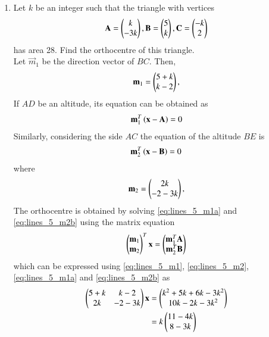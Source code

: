 \begin{enumerate}[label=\arabic*.,ref=\thesubsection.\theenumi]
\item Let $k$ be an integer such that the triangle with vertices
\begin{equation}
\label{eq:lines_5}
\mathbf{A} = \begin{pmatrix}k\\-3k\end{pmatrix},
\mathbf{B} =\begin{pmatrix}5\\k\end{pmatrix},
\mathbf{C} =\begin{pmatrix}-k\\2\end{pmatrix}
\end{equation}
has area 28.  Find the orthocentre of this triangle.
%
\\
\solution Let $\vec{m}_1$ be the direction vector of $BC$.  Then,
\begin{align}
\label{eq:lines_5_m1}
\mathbf{m}_1 = \begin{pmatrix}5+k\\k-2\end{pmatrix},
\end{align}
%
If $AD$ be an altitude, its equation can be obtained as
\begin{align}
\label{eq:lines_5_m1a}
\mathbf{m}_1^{T}\left(\mathbf{x}-\mathbf{A}\right) = 0
\end{align}
%
Similarly, considering the side $AC$  the equation of the altitude $BE$ is
\begin{align}
\label{eq:lines_5_m2b}
\mathbf{m}_2^{T}\left(\mathbf{x}-\mathbf{B}\right) = 0
\end{align}
%
where 
\begin{align}
\label{eq:lines_5_m2}
\mathbf{m}_2 = \begin{pmatrix}2k\\-2-3k\end{pmatrix},
\end{align}
The orthocentre is obtained by solving \eqref{eq:lines_5_m1a}
and \eqref{eq:lines_5_m2b} using the matrix equation
\begin{align}
\begin{pmatrix}\mathbf{m}_1\\ \mathbf{m}_2\end{pmatrix}^T \mathbf{x} 
= \begin{pmatrix} \mathbf{m}_1^T\mathbf{A}\\ \mathbf{m}_2^T
\mathbf{B}\end{pmatrix}
\end{align}
%
which can be expressed using \eqref{eq:lines_5_m1}, 
\eqref{eq:lines_5_m2}, 
\eqref{eq:lines_5_m1a} and 
\eqref{eq:lines_5_m2b}
as 
\begin{align}
\begin{pmatrix}5+k & k-2 \\2k & -2-3k\end{pmatrix} \mathbf{x} 
&= \begin{pmatrix} k^2+5k+6k-3k^2\\ 10k-2k-3k^2\end{pmatrix}
\nonumber \\
&= k\begin{pmatrix} 11-4k\\ 8-3k\end{pmatrix}
\label{eq:lines_5_h}
\end{align}
%

\end{enumerate}
